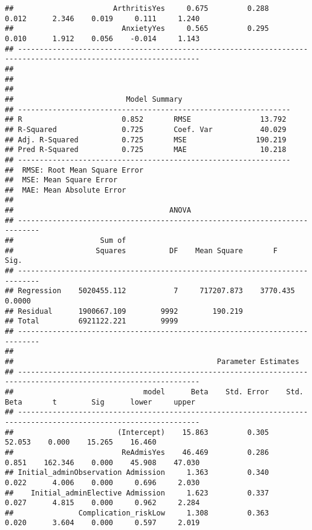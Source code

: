 \documentclass[
]{article}
\begin{document}
\begin{verbatim}
##                       ArthritisYes     0.675         0.288        0.012      2.346    0.019     0.111     1.240 
##                         AnxietyYes     0.565         0.295        0.010      1.912    0.056    -0.014     1.143 
## ----------------------------------------------------------------------------------------------------------------
## 
## 
## 
##                          Model Summary                          
## ---------------------------------------------------------------
## R                       0.852       RMSE                13.792 
## R-Squared               0.725       Coef. Var           40.029 
## Adj. R-Squared          0.725       MSE                190.219 
## Pred R-Squared          0.725       MAE                 10.218 
## ---------------------------------------------------------------
##  RMSE: Root Mean Square Error 
##  MSE: Mean Square Error 
##  MAE: Mean Absolute Error 
## 
##                                    ANOVA                                    
## ---------------------------------------------------------------------------
##                    Sum of                                                  
##                   Squares          DF    Mean Square       F          Sig. 
## ---------------------------------------------------------------------------
## Regression    5020455.112           7     717207.873    3770.435    0.0000 
## Residual      1900667.109        9992        190.219                       
## Total         6921122.221        9999                                      
## ---------------------------------------------------------------------------
## 
##                                               Parameter Estimates                                                
## ----------------------------------------------------------------------------------------------------------------
##                              model      Beta    Std. Error    Std. Beta       t        Sig      lower     upper 
## ----------------------------------------------------------------------------------------------------------------
##                        (Intercept)    15.863         0.305                  52.053    0.000    15.265    16.460 
##                         ReAdmisYes    46.469         0.286        0.851    162.346    0.000    45.908    47.030 
## Initial_adminObservation Admission     1.363         0.340        0.022      4.006    0.000     0.696     2.030 
##    Initial_adminElective Admission     1.623         0.337        0.027      4.815    0.000     0.962     2.284 
##               Complication_riskLow     1.308         0.363        0.020      3.604    0.000     0.597     2.019 

\end{verbatim}
\end{document}
